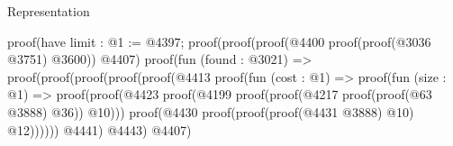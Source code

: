 \begin{lexlean}{Representation}
\begin{coremodule}
                                                                    proof(have limit : @1 := @4397;
                                                                      proof(proof(proof(@4400
                                                                              proof(proof(@3036
                                                                                    @3751)
                                                                                  @3600))
                                                                            @4407)
                                                                          proof(fun (found : @3021) =>
                                                                            proof(proof(proof(proof(proof(@4413
                                                                                        proof(fun (cost : @1) =>
                                                                                          proof(fun (size : @1) =>
                                                                                            proof(proof(@4423
                                                                                                  proof(@4199
                                                                                                      proof(proof(@4217
                                                                                                            proof(proof(@63
                                                                                                                  @3888)
                                                                                                                @36))
                                                                                                          @10)))
                                                                                                proof(@4430
                                                                                                    proof(proof(proof(@4431
                                                                                                            @3888)
                                                                                                          @10)
                                                                                                        @12))))))
                                                                                      @4441)
                                                                                    @4443)
                                                                                  @4407)

\end{coremodule}
\end{lexlean}
